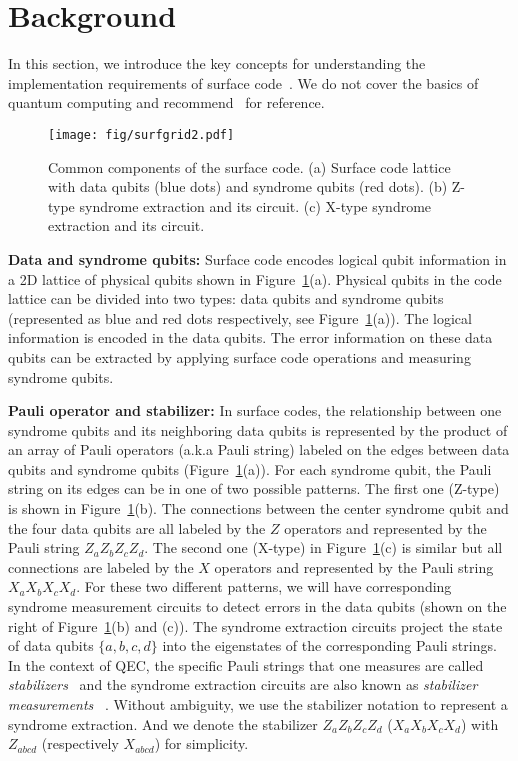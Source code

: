 
\section{Background} 

In this section, we introduce the key concepts for understanding the implementation requirements of surface code~\cite{bravyi1998quantum,dennis2002topological,barends2014superconducting}. 
We do not cover the basics of quantum computing and recommend~\cite{nielsen2002quantum} for reference.

\begin{figure}[ht]
    \centering
    \texttt{[image: fig/surfgrid2.pdf]}
    \caption{Common components of the surface code. (a) Surface code lattice with data qubits (blue dots) and syndrome qubits (red dots). (b) Z-type syndrome extraction and its circuit. (c) X-type syndrome extraction and its circuit.}
    \label{fig:surf_grid}
\end{figure}

\textbf{Data and syndrome qubits:}
Surface code encodes logical qubit information in a 2D lattice of physical qubits shown in Figure~\ref{fig:surf_grid}(a). Physical qubits in the code lattice can be divided into two types: data qubits and syndrome qubits (represented as blue and red dots respectively, see Figure~\ref{fig:surf_grid}(a)).
The logical information is encoded in the data qubits.
The error information on these data qubits can be extracted by applying surface code operations and measuring  syndrome qubits.

\textbf{Pauli operator and stabilizer:}
In surface codes, the relationship between one syndrome qubits and its neighboring data qubits is represented by the product of an array of Pauli operators (a.k.a Pauli string) labeled on the edges between data qubits and syndrome qubits (Figure~\ref{fig:surf_grid}(a)).
For each syndrome qubit, the Pauli string on its edges can be in one of two possible patterns. %
The first one (Z-type) is shown in Figure~\ref{fig:surf_grid}(b).
The connections between the center syndrome qubit and the four data qubits are all labeled by the $Z$ operators and represented by the Pauli string $Z_aZ_bZ_cZ_d$.
The second one (X-type) in Figure~\ref{fig:surf_grid}(c) is similar but all connections are labeled by the $X$ operators and represented by the Pauli string $X_aX_bX_cX_d$.
For these two different patterns, we will have corresponding syndrome measurement circuits to detect errors in the data qubits (shown on the right of Figure~\ref{fig:surf_grid}(b) and (c)).
The syndrome extraction circuits project the state of data qubits $\{a,b,c,d\}$ into the eigenstates of the corresponding Pauli strings.
In the context of QEC, the specific Pauli strings that one measures are called \textit{stabilizers}~\cite{gottesman1996class} and the syndrome extraction circuits are also known as \textit{stabilizer measurements} ~\cite{ calderbank1997quantum}.
Without ambiguity, we use the stabilizer notation to represent a syndrome extraction. And we denote the stabilizer $Z_aZ_bZ_cZ_d$ ($X_aX_bX_cX_d$) with $Z_{abcd}$ (respectively $X_{abcd}$) for simplicity.

